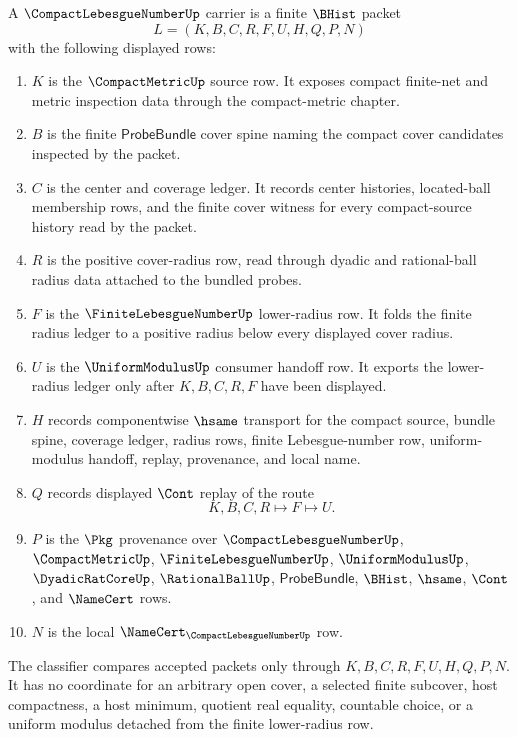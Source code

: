 \begin{definition}
\label{def:compact-lebesgue-number-carrier}
A $\CompactLebesgueNumberUp$ carrier is a finite $\BHist$ packet
$$
L=(K,B,C,R,F,U,H,Q,P,N)
$$
with the following displayed rows:
\begin{enumerate}
\item $K$ is the $\CompactMetricUp$ source row. It exposes compact finite-net and metric inspection data through the compact-metric chapter.
\item $B$ is the finite $\mathsf{ProbeBundle}$ cover spine naming the compact cover candidates inspected by the packet.
\item $C$ is the center and coverage ledger. It records center histories, located-ball membership rows, and the finite cover witness for every compact-source history read by the packet.
\item $R$ is the positive cover-radius row, read through dyadic and rational-ball radius data attached to the bundled probes.
\item $F$ is the $\FiniteLebesgueNumberUp$ lower-radius row. It folds the finite radius ledger to a positive radius below every displayed cover radius.
\item $U$ is the $\UniformModulusUp$ consumer handoff row. It exports the lower-radius ledger only after $K,B,C,R,F$ have been displayed.
\item $H$ records componentwise $\hsame$ transport for the compact source, bundle spine, coverage ledger, radius rows, finite Lebesgue-number row, uniform-modulus handoff, replay, provenance, and local name.
\item $Q$ records displayed $\Cont$ replay of the route
$$
K,B,C,R \longmapsto F \longmapsto U .
$$
\item $P$ is the $\Pkg$ provenance over $\CompactLebesgueNumberUp$, $\CompactMetricUp$, $\FiniteLebesgueNumberUp$, $\UniformModulusUp$, $\DyadicRatCoreUp$, $\RationalBallUp$, $\mathsf{ProbeBundle}$, $\BHist$, $\hsame$, $\Cont$, and $\NameCert$ rows.
\item $N$ is the local $\NameCert_{\CompactLebesgueNumberUp}$ row.
\end{enumerate}
The classifier compares accepted packets only through $K,B,C,R,F,U,H,Q,P,N$. It has no coordinate for an arbitrary open cover, a selected finite subcover, host compactness, a host minimum, quotient real equality, countable choice, or a uniform modulus detached from the finite lower-radius row.
\end{definition}

